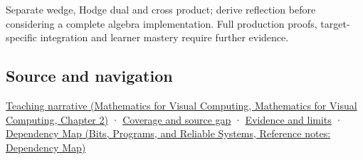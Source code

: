 Separate wedge, Hodge dual and cross product; derive reflection before considering a complete algebra implementation. Full production proofs, target-specific integration and learner mastery require further evidence.

\subsection{Source and navigation}\label{appendix-e1960925d1b8-source-and-navigation}

\href{../02-Mathematics-for-Visual-Computing/main.pdf\#nameddest=01-foundations-i-ch018-oriented-areas-deserve-their-own-representation}{Teaching narrative (Mathematics for Visual Computing, Mathematics for Visual Computing, Chapter 2)} · \hyperref[appendix-fd090d982a15-phase-6---parts-501-600]{Coverage and source gap} · \hyperref[appendix-a103e7846d21-phase-6---source-analysis-and-verification]{Evidence and limits} · \href{../01-Bits-Programs-and-Reliable-Systems/main.pdf\#nameddest=appendix-4ad47bdd269a}{Dependency Map (Bits, Programs, and Reliable Systems, Reference notes: Dependency Map)}

